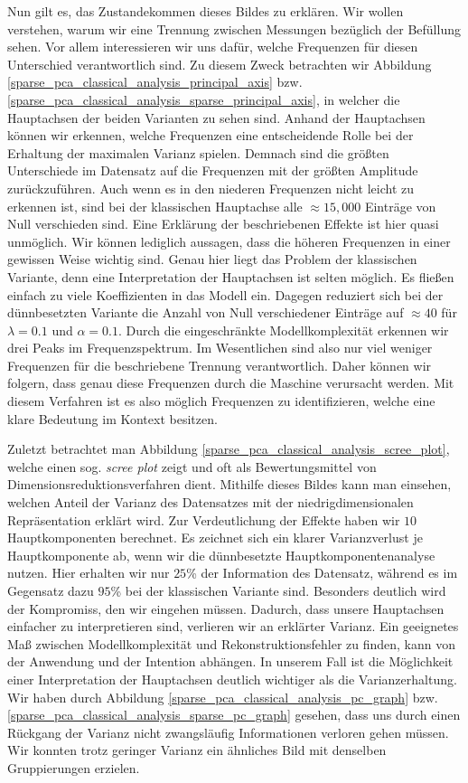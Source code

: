 Nun gilt es, das Zustandekommen dieses Bildes zu erklären. Wir wollen verstehen, warum wir eine Trennung zwischen Messungen bezüglich der Befüllung sehen. Vor allem interessieren wir uns dafür, welche Frequenzen für diesen Unterschied verantwortlich sind. Zu diesem Zweck betrachten wir Abbildung \ref{sparse_pca_classical_analysis_principal_axis} bzw. \ref{sparse_pca_classical_analysis_sparse_principal_axis}, in welcher die Hauptachsen der beiden Varianten zu sehen sind. Anhand der Hauptachsen können wir erkennen, welche Frequenzen eine entscheidende Rolle bei der Erhaltung der maximalen Varianz spielen. Demnach sind die größten Unterschiede im Datensatz auf die Frequenzen mit der größten Amplitude zurückzuführen. Auch wenn es in den niederen Frequenzen nicht leicht zu erkennen ist, sind bei der klassischen Hauptachse alle $\approx 15,000$ Einträge von Null verschieden sind. Eine Erklärung der beschriebenen Effekte ist hier quasi unmöglich. Wir können lediglich aussagen, dass die höheren Frequenzen in einer gewissen Weise wichtig sind. Genau hier liegt das Problem der klassischen Variante, denn eine Interpretation der Hauptachsen ist selten möglich. Es fließen einfach zu viele Koeffizienten in das Modell ein. Dagegen reduziert sich bei der dünnbesetzten Variante die Anzahl von Null verschiedener Einträge auf $\approx 40$ für $\lambda = 0.1$ und $\alpha = 0.1$. Durch die eingeschränkte Modellkomplexität erkennen wir drei Peaks im Frequenzspektrum. Im Wesentlichen sind also nur viel weniger Frequenzen für die beschriebene Trennung verantwortlich. Daher können wir folgern, dass genau diese Frequenzen durch die Maschine verursacht werden. Mit diesem Verfahren ist es also möglich Frequenzen zu identifizieren, welche eine klare Bedeutung im Kontext besitzen.

Zuletzt betrachtet man Abbildung \ref{sparse_pca_classical_analysis_scree_plot}, welche einen sog. \textit{scree plot} zeigt und oft als Bewertungsmittel von Dimensionsreduktionsverfahren dient. Mithilfe dieses Bildes kann man einsehen, welchen Anteil der Varianz des Datensatzes mit der niedrigdimensionalen Repräsentation erklärt wird. Zur Verdeutlichung der Effekte haben wir $10$ Hauptkomponenten berechnet. Es zeichnet sich ein klarer Varianzverlust je Hauptkomponente ab, wenn wir die dünnbesetzte Hauptkomponentenanalyse nutzen. Hier erhalten wir nur $25$\% der Information des Datensatz, während es im Gegensatz dazu $95$\% bei der klassischen Variante sind. Besonders deutlich wird der Kompromiss, den wir eingehen müssen. Dadurch, dass unsere Hauptachsen einfacher zu interpretieren sind, verlieren wir an erklärter Varianz. Ein geeignetes Maß zwischen Modellkomplexität und Rekonstruktionsfehler zu finden, kann von der Anwendung und der Intention abhängen. In unserem Fall ist die Möglichkeit einer Interpretation der Hauptachsen deutlich wichtiger als die Varianzerhaltung. Wir haben durch Abbildung \ref{sparse_pca_classical_analysis_pc_graph} bzw. \ref{sparse_pca_classical_analysis_sparse_pc_graph} gesehen, dass uns durch einen Rückgang der Varianz nicht zwangsläufig Informationen verloren gehen müssen. Wir konnten trotz geringer Varianz ein ähnliches Bild mit denselben Gruppierungen erzielen.

